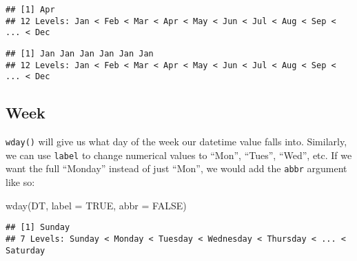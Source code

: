 \documentclass[
]{book}
\newenvironment{Shaded}{\begin{snugshade}}{\end{snugshade}}
\newcommand{\AttributeTok}[1]{\textcolor[rgb]{0.77,0.63,0.00}{#1}}
\newcommand{\ConstantTok}[1]{\textcolor[rgb]{0.00,0.00,0.00}{#1}}
\newcommand{\FunctionTok}[1]{\textcolor[rgb]{0.00,0.00,0.00}{#1}}
\newcommand{\NormalTok}[1]{#1}
\newcommand{\SpecialCharTok}[1]{\textcolor[rgb]{0.00,0.00,0.00}{#1}}
\begin{document}
\begin{verbatim}
## [1] Apr
## 12 Levels: Jan < Feb < Mar < Apr < May < Jun < Jul < Aug < Sep < ... < Dec
\end{verbatim}

\begin{Shaded}
\end{Shaded}

\begin{verbatim}
## [1] Jan Jan Jan Jan Jan Jan
## 12 Levels: Jan < Feb < Mar < Apr < May < Jun < Jul < Aug < Sep < ... < Dec
\end{verbatim}

\hypertarget{week}{%
\subsection{Week}\label{week}}

\texttt{wday()} will give us what day of the week our datetime value falls into. Similarly, we can use \texttt{label} to change numerical values to ``Mon'', ``Tues'', ``Wed'', etc. If we want the full ``Monday'' instead of just ``Mon'', we would add the \texttt{abbr} argument like so:

\begin{Shaded}
\begin{Highlighting}[]
\FunctionTok{wday}\NormalTok{(DT, }\AttributeTok{label =} \ConstantTok{TRUE}\NormalTok{, }\AttributeTok{abbr =} \ConstantTok{FALSE}\NormalTok{)}
\end{Highlighting}
\end{Shaded}

\begin{verbatim}
## [1] Sunday
## 7 Levels: Sunday < Monday < Tuesday < Wednesday < Thursday < ... < Saturday
\end{verbatim}

\begin{Shaded}
\end{Shaded}
\end{document}
